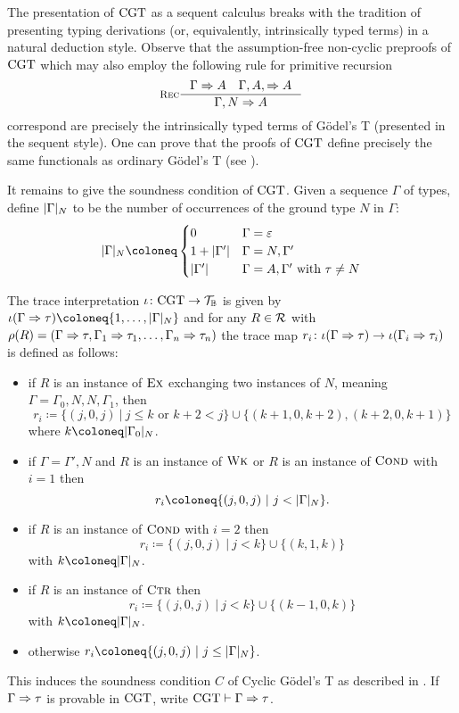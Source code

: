 The presentation of $\mathrm{CGT}$ as a sequent calculus breaks with the tradition of
presenting typing derivations (or, equivalently, intrinsically typed terms) in a
natural deduction style. Observe that the assumption-free non-cyclic preproofs
of $\mathrm{CGT}$ which may also employ the following rule for primitive recursion
\[
  \inference[\RRec]{\Gamma \sdash A \quad \Gamma, A, \sdash A}{\Gamma, N \sdash A}
\]
correspond are precisely the intrinsically typed terms of Gödel's T (presented
in the sequent style).
One can prove that the proofs of $\mathrm{CGT}$ define precisely the
same functionals as ordinary Gödel's T (see \parencite[Theorem
94]{dasCircularVersionGodel2021}).

It remains to give the soundness condition of $\mathrm{CGT}$.
Given a sequence $\Gamma$ of types, define $|\Gamma|_N$ to be the number
of occurrences of the ground type \( N \) in \( \Gamma \):
\[\abs{\Gamma}_N \coloneq
  \begin{cases}
    0 & \Gamma = \varepsilon \\
    1 + \abs{\Gamma'} & \Gamma = N, \Gamma' \\
    \abs{\Gamma'} & \Gamma = A, \Gamma' \text{ with } \tau \neq N
  \end{cases}
\]

\begin{definition}
  The trace interpretation $\iota \colon \mathrm{CGT} \to \mathcal{T}_{\mathbb{B}}$ is given by $\iota(\Gamma
  \sdash \tau) \coloneq \{1, \ldots, \abs{\Gamma}_N\}$ and for any $R \in \mathcal{R}$
  with $\rho(R) = (\Gamma \Rightarrow \tau, \Gamma_1 \Rightarrow \tau_1, \ldots,
  \Gamma_n \Rightarrow \tau_n)$ the trace map $r_i \colon \iota(\Gamma \Rightarrow \tau) \to
  \iota(\Gamma_i \Rightarrow \tau_i)$ is defined as follows:
  \begin{itemize}
  \item
    if $R$ is an instance of $\textsc{Ex}$ exchanging two instances of $N$, meaning $\Gamma = \Gamma_0, N,
    N, \Gamma_1$, then
    \[
      r_i \coloneq \{(j, 0, j) ~|~ j \leq k \text{ or } k + 2 < j\} \cup \{(k + 1
      , 0, k + 2), (k + 2, 0, k + 1)\}
    \]
    where $k \coloneq \abs{\Gamma_0}_N$.
  \item if $\Gamma = \Gamma', N$ and $R$ is an instance of $\textsc{Wk}$ or $R$ is an
    instance of $\textsc{Cond}$ with $i = 1$ then
    \[
      r_i \coloneq \{(j, 0, j) ~|~ j < \abs{\Gamma}_N\}.
    \]
  \item if $R$ is an instance of $\textsc{Cond}$ with $i = 2$ then
    \[
      r_i \coloneq \{(j, 0, j) ~|~ j < k\} \cup \{(k, 1, k)\}
    \]
    with $k \coloneq \abs{\Gamma}_N$.
  \item if $R$ is an instance of $\textsc{Ctr}$ then
    \[
      r_i \coloneq \{(j, 0, j) ~|~ j < k\} \cup \{(k - 1, 0, k)\}
    \]
    with $k \coloneq \abs{\Gamma}_N$.
  \item otherwise $ r_i \coloneq \{(j, 0, j) ~|~ j \leq \abs{\Gamma}_N\} $.
  \end{itemize}
  This induces the soundness condition $C$ of Cyclic Gödel's T as described in
  .
  If $\Gamma \Rightarrow \tau$ is provable in $\mathrm{CGT}$, write $\mathrm{CGT} \vdash \Gamma
  \Rightarrow \tau$.
\end{definition}

